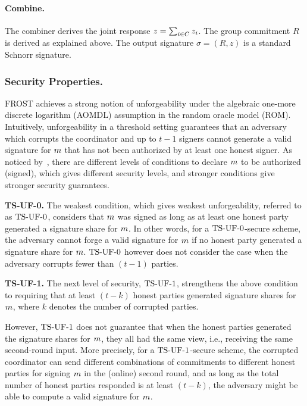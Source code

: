 \paragraph{Combine.}
The combiner derives the joint response $z = \sum_{i \in C} z_i$.
The group commitment $R$ is derived as explained above.
The output signature $\sigma = (R,z)$ is a standard Schnorr signature.

\subsubsection{Security Properties.}
FROST achieves a strong notion of unforgeability under the algebraic one-more discrete logarithm (AOMDL) assumption in the random oracle model (ROM).
Intuitively, unforgeability in a threshold setting guarantees that an adversary which corrupts the coordinator and up to $t-1$ signers cannot generate a valid signature for $m$ that has not been authorized by at least one honest signer.
As noticed by~\cite{BellareCKMTZ22}, there are different levels of conditions to declare $m$ to be authorized (signed), which gives different security levels, and stronger conditions give stronger security guarantees.


\medskip

\textbf{TS-UF-0.} The weakest condition, which gives weakest unforgeability, referred to as $\mathrm{TS}\mbox{-}\mathrm{UF}\mbox{-}{0}$, considers that $m$ was signed as long as at least one honest party generated a signature share for $m$. In other words, for a $\mathrm{TS}\mbox{-}\mathrm{UF}\mbox{-}{0}$-secure scheme, the adversary cannot forge a valid signature for $m$ if no honest party generated a signature share for $m$.
$\mathrm{TS}\mbox{-}\mathrm{UF}\mbox{-}{0}$ however does not consider the case when the adversary corrupts fewer than $(t-1)$ parties.

\medskip

\textbf{TS-UF-1.} The next level of security, $\mathrm{TS}\mbox{-}\mathrm{UF}\mbox{-}{1}$, strengthens the above condition to requiring that at least $(t - k)$ honest parties generated signature shares for $m$,
where $k$ denotes the number of corrupted parties.

However, $\mathrm{TS}\mbox{-}\mathrm{UF}\mbox{-}{1}$ does not guarantee that when the honest parties generated the signature shares for $m$, they all had the same view, i.e., receiving the same second-round input.
More precisely, for a $\mathrm{TS}\mbox{-}\mathrm{UF}\mbox{-}{1}$-secure scheme, the corrupted coordinator can send different combinations of commitments to different honest parties for signing $m$ in the (online) second round,
and as long as the total number of honest parties responded is at least $(t-k)$, the adversary might be able to compute a valid signature for $m$.


